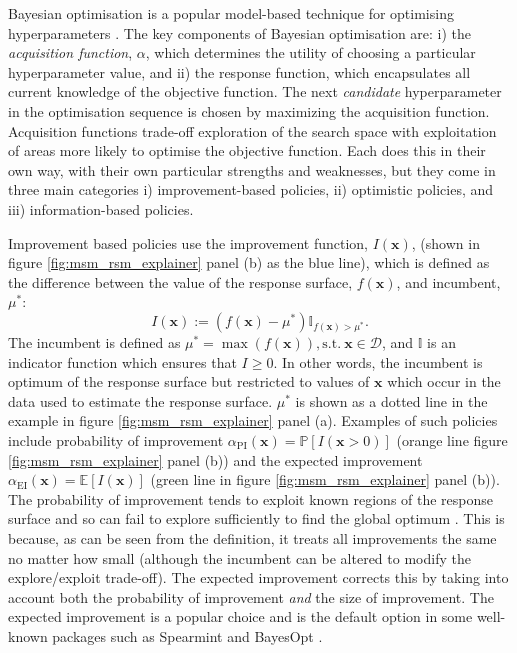 Bayesian optimisation is a popular model-based technique for optimising hyperparameters \cite{bergstraAlgorithmsHyperParameterOptimizationa}\cite{hutterSequentialModelbasedOptimization2011}\cite{NIPS2012_4522}\cite{bergstraMakingScienceModel2013}\cite{feurer2019hyperparameter}. The key components of Bayesian optimisation are: i) the \emph{acquisition function}, $\alpha$, which determines the utility of choosing a particular hyperparameter value, and ii) the response function, which encapsulates all current knowledge of the objective function.  The next \emph{candidate} hyperparameter in the optimisation sequence is chosen by maximizing the acquisition function.\cite{shahriariTakingHumanOut2016} Acquisition functions trade-off exploration of the search space with exploitation of areas more likely to optimise the objective function. Each does this in their own way, with their own particular strengths and weaknesses, but they come in three main categories i) improvement-based policies, ii) optimistic policies, and iii) information-based policies. \cite{shahriariTakingHumanOut2016}

Improvement based policies use the improvement function, $I(\mathbf{x})$, (shown in figure \ref{fig:msm_rsm_explainer} panel (b) as the blue line), which is defined as the  difference between the value of the response surface, $f(\mathbf{x})$, and incumbent, $\mu^{*}$:\cite{shahriariTakingHumanOut2016}
\begin{equation}
    I(\mathbf{x}):=\left(f(\mathbf{x}) - \mu^{*}\right) \mathbb{I}_{f(\mathbf{x}) > \mu^{*}}. 
\end{equation}
The incumbent\cite{brochuTutorialBayesianOptimization2010} is defined as $\mu^{*}=\max{(f(\mathbf{x}))}, \mathrm{s.t.}\ \mathbf{x} \in \mathcal{D}$, and $\mathbb{I}$ is an indicator function which ensures that $I \ge 0$. In other words, the incumbent is optimum of the response surface but restricted to values of $\mathbf{x}$ which occur in the data used to estimate the response surface. $\mu^{*}$ is shown as a dotted line in the example in figure \ref{fig:msm_rsm_explainer} panel (a). Examples of such policies include probability of improvement \cite{Kushner1963} $\alpha_{\mathrm{PI}}(\mathbf{x}) = \mathbb{P}\left[I(\mathbf{x}>0)\right]$  (orange line figure \ref{fig:msm_rsm_explainer} panel (b)) and the expected improvement \cite{mockus1978application} $\alpha_{\mathrm{EI}}(\mathbf{x}) = \mathbb{E}\left[I(\mathbf{x})\right]$ (green line in figure \ref{fig:msm_rsm_explainer} panel (b)). The probability of improvement tends to exploit known regions of the response surface and so can fail to explore sufficiently to find the global optimum \cite{jones2001taxonomy}. This is because, as can be seen from the definition, it treats all improvements the same no matter how small (although the incumbent can be altered to modify the explore/exploit trade-off).\cite{jones2001taxonomy}  The expected improvement corrects this by taking into account both the probability of improvement \emph{and} the size of improvement. The expected improvement is a popular choice \cite{feurer2019hyperparameter} and is the default option in some well-known packages such as Spearmint \cite{NIPS2012_4522} and BayesOpt \cite{martinez-cantinBayesOptBayesianOptimization2014}. 

